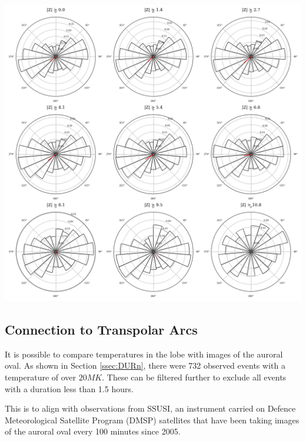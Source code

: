 \documentclass[12pt]{article}
\newenvironment{Figure}
  {\par\medskip\noindent\minipage{\linewidth}}
  {\endminipage\par\medskip}
\begin{document}
\begin{Figure}
    \centering
    \includegraphics[width=\textwidth]{imf_angle_hist.png}
    \label{fig:imf_angle_hist}
\end{Figure}

\subsection{Connection to Transpolar Arcs}
It is possible to compare temperatures in the lobe with images of the auroral oval. As shown in Section \ref{ssec:DURn}, there were 732 observed events with a temperature of over $20MK$. These can be filtered further to exclude all events with a duration less than 1.5 hours. 

This is to align with observations from SSUSI, an instrument carried on Defence Meteorological Satellite Program (DMSP) satellites that have been taking images of the auroral oval every 100 minutes since 2005. 
\end{document}
